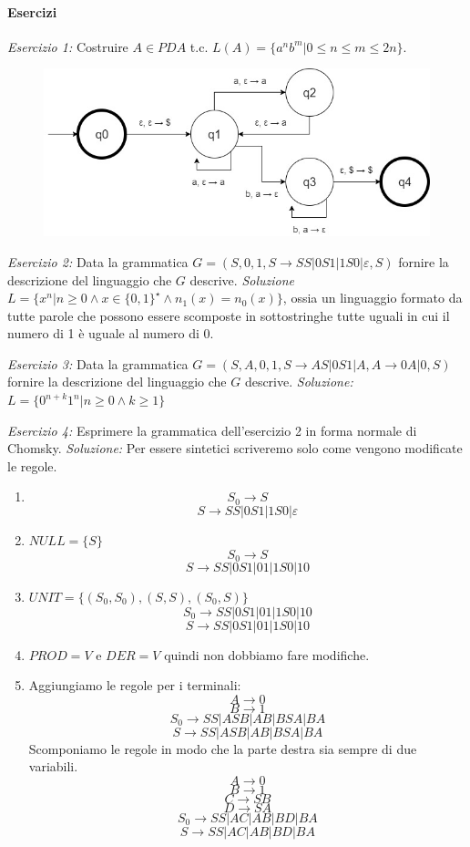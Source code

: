 \paragraph{Esercizi}
\begin{description}
	\item \textit{Esercizio 1:} Costruire $A \in PDA$ t.c. $L(A) =\{ a^nb^m | 0 \leq n \leq m \leq 2n \}$.
	\begin{figure}[H]
	\includegraphics[scale=0.5]{p4}
	\end{figure}
	\item \textit{Esercizio 2:} Data la grammatica $G = ({S}, {0,1}, {S \to SS | 0S1 | 1S0 | \varepsilon}, S)$ fornire la descrizione del linguaggio che $G$ descrive.\newline
	\textit{Soluzione} $L = \{ x^n | n \geq 0 \land x \in \{0,1\}^{\star} \land n_1(x)=n_0(x)\}$, ossia un linguaggio formato da tutte parole che possono essere scomposte in sottostringhe tutte uguali in cui il numero di 1 è uguale al numero di 0.
	\item \textit{Esercizio 3:}  Data la grammatica $G = ({S, A}, {0,1}, {S \to AS | 0S1 | A, A \to 0A | 0 }, S)$ fornire la descrizione del linguaggio che $G$ descrive.\newline
	\textit{Soluzione:} $L = \{0^{n+k} 1^n | n \geq 0 \land k \geq 1\}$
	\item \textit{Esercizio 4:} Esprimere la grammatica dell'esercizio 2 in forma normale di Chomsky.\newline
	\textit{Soluzione:} Per essere sintetici scriveremo solo come vengono modificate le regole.
	\begin{enumerate}
		\setcounter{enumi}{0}
		\item \[S_0 \to S\] \[S \to SS | 0S1 | 1S0 | \varepsilon \]
		\item $NULL=\{S\}$
		\[S_0 \to S\] \[S \to SS | 0S1 | 01 | 1S0 | 10 \]
		\item $UNIT = \{(S_0, S_0),(S,S),(S_0, S)\}$
		\[S_0 \to  SS | 0S1 | 01 | 1S0 | 10 \] \[S \to SS | 0S1 | 01 | 1S0 | 10 \]
		\item $PROD = V$ e $DER = V$ quindi non dobbiamo fare modifiche.
		\item Aggiungiamo le regole per i terminali:
		\[A \to 0\]\[B \to 1\]
		\[S_0 \to  SS | ASB | AB | BSA | BA \] \[S \to SS | ASB | AB | BSA | BA \]
		Scomponiamo le regole in modo che la parte destra sia sempre di due variabili.
		\[A \to 0\]\[B \to 1\]\[C \to SB\]\[D \to SA\]
		\[S_0 \to  SS | AC | AB | BD | BA \] \[S \to SS |AC | AB | BD | BA \]
	\end{enumerate}
\end{description}
